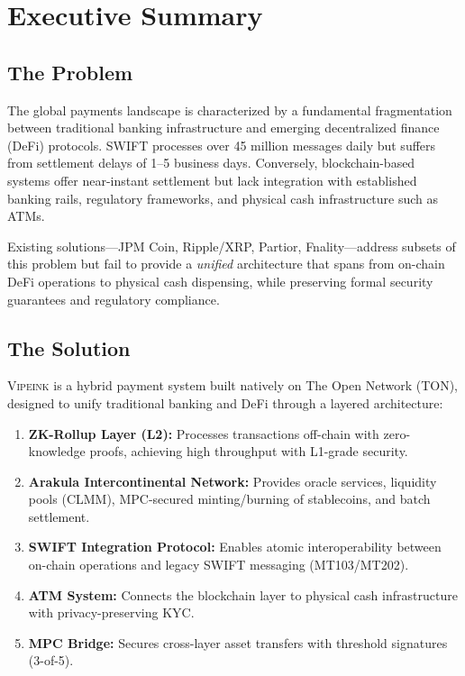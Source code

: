 \documentclass[12pt,a4paper]{article}
\theoremstyle{definition}
\theoremstyle{remark}
\newcommand{\Vipeink}{\textsc{Vipeink}}
\newcommand{\TON}{\textsc{TON}}
\begin{document}
\newpage
\tableofcontents
\newpage

\section{Executive Summary}
\label{sec:executive-summary}

\subsection{The Problem}

The global payments landscape is characterized by a fundamental fragmentation between traditional banking infrastructure and emerging decentralized finance (DeFi) protocols. SWIFT processes over 45 million messages daily but suffers from settlement delays of 1--5 business days. Conversely, blockchain-based systems offer near-instant settlement but lack integration with established banking rails, regulatory frameworks, and physical cash infrastructure such as ATMs.

Existing solutions---JPM Coin, Ripple/XRP, Partior, Fnality---address subsets of this problem but fail to provide a \emph{unified} architecture that spans from on-chain DeFi operations to physical cash dispensing, while preserving formal security guarantees and regulatory compliance.

\subsection{The Solution}

\Vipeink{} is a hybrid payment system built natively on The Open Network (\TON{}), designed to unify traditional banking and DeFi through a layered architecture:

\begin{enumerate}[nosep]
    \item \textbf{ZK-Rollup Layer (L2):} Processes transactions off-chain with zero-knowledge proofs, achieving high throughput with L1-grade security.
    \item \textbf{Arakula Intercontinental Network:} Provides oracle services, liquidity pools (CLMM), MPC-secured minting/burning of stablecoins, and batch settlement.
    \item \textbf{SWIFT Integration Protocol:} Enables atomic interoperability between on-chain operations and legacy SWIFT messaging (MT103/MT202).
    \item \textbf{ATM System:} Connects the blockchain layer to physical cash infrastructure with privacy-preserving KYC.
    \item \textbf{MPC Bridge:} Secures cross-layer asset transfers with threshold signatures (3-of-5).
\end{enumerate}
\end{document}
